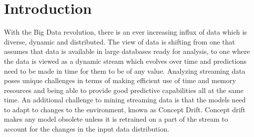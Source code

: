 \documentclass[conference]{IEEEtran}
\begin{document}
%



\section{Introduction}
With the Big Data revolution, there is an ever increasing influx  of data which is diverse, dynamic and distributed. The view of data is shifting from one that assumes that data is available in large databases ready for analysis, to one where the data is viewed as a dynamic stream which evolves over time and predictions need to be made in time for them to be of any value. Analyzing streaming data poses unique challenges in terms of making efficient use of time and memory resources and being able to provide good predictive capabilities all at the same time. An additional challenge to mining streaming data is that the models need to adapt to changes to the environment, known as Concept Drift\cite{Tsymbal(2004)}\cite{Zliobaite(2009)}. Concept drift makes any model obsolete unless it is retrained on a part of the stream to account for the changes in the input data distribution.
\end{document}
